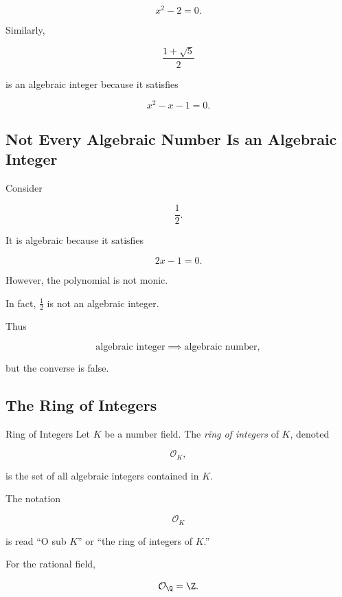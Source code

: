 \[ x^2-2=0. \]

Similarly,

\[ \frac{1+\sqrt5}{2} \]

is an algebraic integer because it satisfies

\[ x^2-x-1=0. \]

\subsection{Not Every Algebraic Number Is an Algebraic Integer}
\label{subsec:algebraic-not-integer}

Consider

\[ \frac12. \]

It is algebraic because it satisfies

\[ 2x-1=0. \]

However, the polynomial is not monic.

In fact, \(\frac12\) is not an algebraic integer.

Thus

\[
\boxed{
\text{algebraic integer}
\implies
\text{algebraic number},
}
\]

but the converse is false.

\subsection{The Ring of Integers}
\label{subsec:ring-of-integers-number-field}

\begin{definitionbox}{Ring of Integers}
Let \(K\) be a number field. The \emph{ring of integers} of \(K\), denoted

\[ \mathcal O_K, \]

is the set of all algebraic integers contained in \(K\).
\end{definitionbox}

The notation

\[ \mathcal O_K \]

is read ``O sub \(K\)'' or ``the ring of integers of \(K\).''

For the rational field,

\[ \mathcal O_{\Q}=\Z. \]

